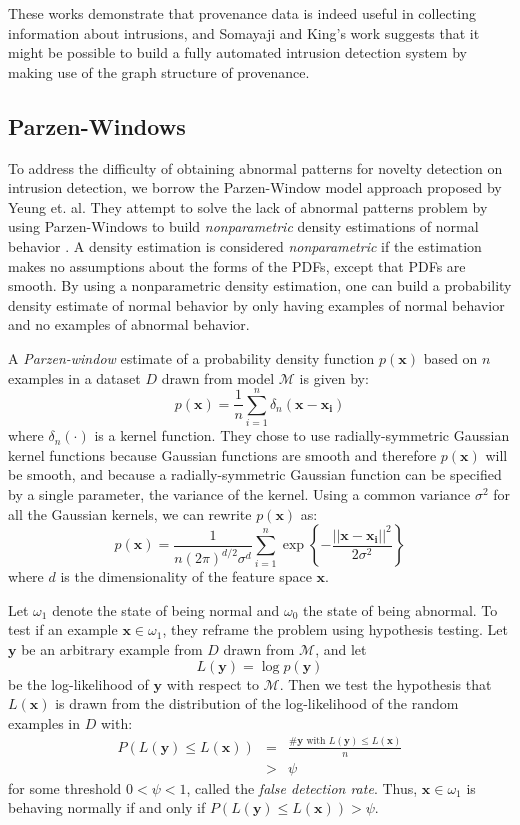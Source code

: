 \documentclass[10pt,twocolumn]{article}
\newcommand{\m}[1]{\mathbf{#1}}
\begin{document}
These works demonstrate that provenance data is indeed useful in collecting information about intrusions, and
Somayaji and King's work suggests that it might be possible to build a fully automated intrusion detection
system by making use of the graph structure of provenance.

\subsection{Parzen-Windows}

To address the difficulty of obtaining abnormal patterns for novelty detection on intrusion detection, we borrow
the Parzen-Window model approach proposed by Yeung et. al.
They attempt to solve the lack of abnormal patterns problem by using Parzen-Windows to build {\em nonparametric}
density estimations of normal behavior \cite{parzen}. A density estimation is considered {\em nonparametric} if the estimation
makes no assumptions about the forms of the PDFs, except that PDFs are smooth. By using a nonparametric
density estimation, one can build a probability density estimate of normal behavior by only having examples of normal
behavior and no examples of abnormal behavior.

A {\em Parzen-window} estimate of a probability density function $p(\m{x})$
based on $n$ examples in a dataset $D$ drawn from model $\mathcal{M}$ is given by:
$$p(\m{x}) = \frac{1}{n} \sum_{i=1}^n \delta_n (\m{x} - \m{x_i})$$
where $\delta_n(\cdot)$ is a kernel function. They chose to use radially-symmetric Gaussian kernel functions because
Gaussian functions are smooth and therefore $p(\m{x})$ will be smooth, and because a radially-symmetric Gaussian function
can be specified by a single parameter, the variance of the kernel. Using a common variance $\sigma^2$ for all
the Gaussian kernels, we can rewrite $p(\m{x})$ as:
$$p(\m{x}) = \frac{1}{n(2\pi)^{d/2} \sigma^d} \sum_{i=1}^n  \exp \left\{  - \frac{|| \m{x} - \m{x_i}||^2}{2 \sigma^2}  \right\}$$
where $d$ is the dimensionality of the feature space $\m{x}$.

Let $\omega_1$ denote the state of being normal and $\omega_0$ the state of being abnormal.
To test if an example $\m{x} \in \omega_1$, they reframe the problem using hypothesis testing. Let $\m{y}$ be
an arbitrary example from $D$ drawn from $\mathcal{M}$, and let 
$$L(\m{y}) = \log p(\m{y})$$
be the log-likelihood of $\m{y}$ with respect to $\mathcal{M}$. Then we test the hypothesis that
$L(\m{x})$ is drawn from the distribution of the log-likelihood of the random examples in $D$ with:
\begin{eqnarray*}
P(L(\m{y}) \leq L(\m{x})) 
&=&  \frac{\#\m{y} \mbox { with } L(\m{y}) \leq L(\m{x})}{n} \\
&>& \psi
\end{eqnarray*}
for some threshold $0 < \psi < 1$, called the {\em false detection rate}. 
Thus, $\m{x} \in \omega_1$ is behaving normally if and only if $P(L(\m{y}) \leq L(\m{x})) > \psi$. 
\end{document}
